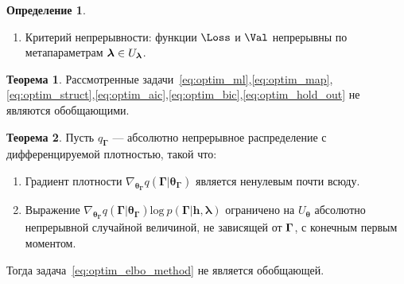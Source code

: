 \documentclass[11pt, a5paper]{dissert}
\theoremstyle{definition}
\newtheorem{theorem}{Теорема}
\newtheorem{defin}{Определение}
\begin{document}
{\begin{defin}
\begin{enumerate}
\item Критерий непрерывности: функции $\Loss$ и $\Val$ непрерывны по метапараметрам $\boldsymbol{\lambda} \in U_{\boldsymbol{\lambda}}$.
\end{enumerate}
\end{defin}

\begin{theorem}Рассмотренные задачи~\eqref{eq:optim_ml},\eqref{eq:optim_map},\eqref{eq:optim_struct},\eqref{eq:optim_aic},\eqref{eq:optim_bic},\eqref{eq:optim_hold_out} не являются обобщающими.
\end{theorem}

\begin{theorem}
Пусть $q_{\boldsymbol{\Gamma}}$ --- абсолютно непрерывное распределение с дифференцируемой плотностью, такой что:
\begin{enumerate}
\item Градиент плотности $\nabla_{\boldsymbol{\theta}_{\boldsymbol{\Gamma}}} q(\boldsymbol{\Gamma}|\boldsymbol{\theta}_{\boldsymbol{\Gamma}})$ является ненулевым почти всюду.
\item Выражение $\nabla_{\boldsymbol{\theta}_{\boldsymbol{\Gamma}}} q(\boldsymbol{\Gamma}|\boldsymbol{\theta}_{\boldsymbol{\Gamma}}) \text{log}~p(\boldsymbol{\Gamma}|\mathbf{h}, \boldsymbol{\lambda})$ ограничено на $U_{\boldsymbol{\theta}}$ абсолютно непрерывной случайной величиной, не зависящей от $\boldsymbol{\Gamma}$, с конечным первым моментом.
\end{enumerate}
Тогда задача~\eqref{eq:optim_elbo_method} не является обобщающей.
\end{theorem}


}
\end{document}
